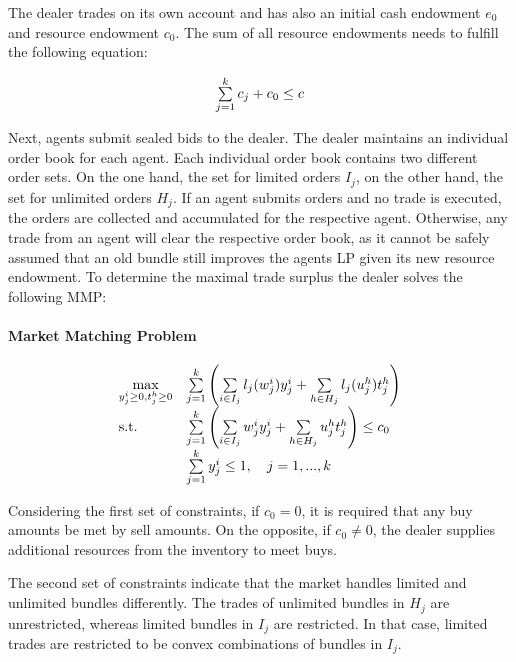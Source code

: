 The dealer trades on its own account and has also an 
initial cash endowment $e_{0}$ and resource endowment $c_{0}$.
The sum of all resource endowments needs to fulfill the following equation:

\begin{equation*}
 \begin{array}{ll@{}ll}
 \sum\limits_{j=1}^{k} c_{j} + c_{0} \leq c
 \end{array}
\end{equation*}

Next, agents submit sealed bids to the dealer. The dealer maintains an individual order book for each agent. 
Each individual order book contains two different order sets. On the one hand, the set for limited orders $I_{j}$,
on the other hand, the set for unlimited orders $H_{j}$.
If an agent submits orders and no trade is executed, the orders are collected and 
accumulated for the respective agent. Otherwise, any trade from an agent will clear the respective order book,
as it cannot be safely assumed that an old bundle still improves the agents LP given its new resource endowment.
To determine the maximal trade surplus the dealer solves the following MMP:

\paragraph*{Market Matching Problem}

\begin{equation}
\label{eq:mmp}
 \begin{array}{ll@{}ll}
 \underset{y_{j}^{i} \geq 0, t_{j}^{h} \geq 0 }{\text{max}} & 
 \sum\limits_{j=1}^{k}
 \left(\sum\limits_{i \in I_{j}}^{} l_{j}(w_{j}^{i})y_{j}^{i} + 
 \sum\limits_{h \in H_{j}}^{} l_{j}(u_{j}^{h})t_{j}^{h} \right) &\\
 \text{s.t.}
 & \sum\limits_{j=1}^{k}
 \left(\sum\limits_{i \in I_{j}}^{} w_{j}^{i}y_{j}^{i} + 
 \sum\limits_{h \in H_{j}}^{} u_{j}^{h}t_{j}^{h} \right) \leq c_{0} \\
 & \sum\limits_{j=1}^{k} y_{j}^{i} \leq 1, \quad j=1 ,..., k
 \end{array}
\end{equation}

Considering the first set of constraints, if $c_{0} = 0$, it is required that any buy amounts be met by sell amounts. 
On the opposite, if $c_{0} \neq 0$, the dealer supplies additional resources from the inventory
to meet buys. 

The second set of constraints indicate that the market handles limited and unlimited bundles differently. 
The trades of unlimited bundles in $H_{j}$ are unrestricted, whereas limited bundles in $I_{j}$
are restricted. In that case, limited trades are restricted to be convex combinations of bundles in $I_{j}$.

